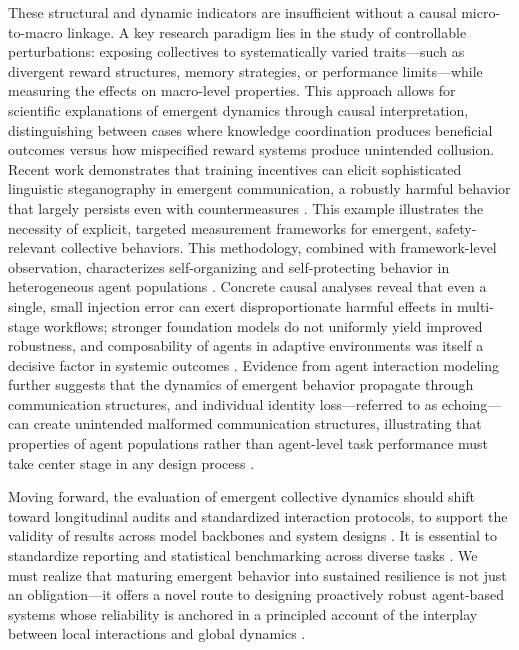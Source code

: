 \documentclass[11pt,a4paper]{article}
\begin{document}
These structural and dynamic indicators are insufficient without a causal micro-to-macro linkage. A key research paradigm lies in the study of controllable perturbations: exposing collectives to systematically varied traits---such as divergent reward structures, memory strategies, or performance limits---while measuring the effects on macro-level properties. This approach allows for scientific explanations of emergent dynamics through causal interpretation, distinguishing between cases where knowledge coordination produces beneficial outcomes versus how mispecified reward systems produce unintended collusion. Recent work demonstrates that training incentives can elicit sophisticated linguistic steganography in emergent communication, a robustly harmful behavior that largely persists even with countermeasures \cite{arxiv:2410.03768v2}. This example illustrates the necessity of explicit, targeted measurement frameworks for emergent, safety-relevant collective behaviors. This methodology, combined with framework-level observation, characterizes self-organizing and self-protecting behavior in heterogeneous agent populations \cite{arxiv:2508.05294v4,arxiv:2501.06322v1}. Concrete causal analyses reveal that even a single, small injection error can exert disproportionate harmful effects in multi-stage workflows; stronger foundation models do not uniformly yield improved robustness, and composability of agents in adaptive environments was itself a decisive factor in systemic outcomes \cite{arxiv:2603.04474v2,arxiv:2602.19843v1}. Evidence from agent interaction modeling further suggests that the dynamics of emergent behavior propagate through communication structures, and individual identity loss---referred to as echoing---can create unintended malformed communication structures, illustrating that properties of agent populations rather than agent-level task performance must take center stage in any design process \cite{arxiv:2511.09710v3}.

Moving forward, the evaluation of emergent collective dynamics should shift toward longitudinal audits and standardized interaction protocols, to support the validity of results across model backbones and system designs \cite{arxiv:2503.09648v1}. It is essential to standardize reporting and statistical benchmarking across diverse tasks \cite{arxiv:2511.05269v1}. We must realize that maturing emergent behavior into sustained resilience is not just an obligation---it offers a novel route to designing proactively robust agent-based systems whose reliability is anchored in a principled account of the interplay between local interactions and global dynamics \cite{arxiv:2506.01245v3}.
\end{document}
